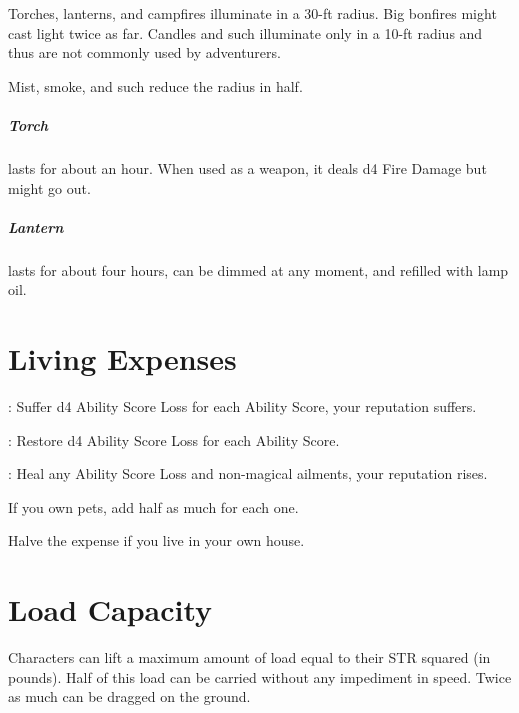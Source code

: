 \documentclass[itdr]{subfiles}
\begin{document}
Torches, lanterns, and campfires illuminate in a \mbox{30-ft} radius. Big bonfires might cast light twice as far. Candles and such illuminate only in a 10-ft radius and thus are not commonly used by adventurers.

Mist, smoke, and such reduce the radius in half.

\subparagraph{Torch} lasts for about an hour. When used as a weapon, it deals d4 Fire Damage but might go out.

\subparagraph{Lantern} lasts for about four hours, can be dimmed at any moment, and refilled with lamp oil.

\vfill
\break

\section{Living Expenses}

:
Suffer d4 Ability Score Loss for each Ability Score, your reputation suffers.

:
Restore d4 Ability Score Loss for each Ability Score.

:
Heal any Ability Score Loss and non-magical ailments, your reputation rises.

If you own pets, add half as much for each one.

Halve the expense if you live in your own house.

\vfill

\section{Load Capacity}

Characters can lift a maximum amount of load equal to their STR squared (in pounds). Half of this load can be carried without any impediment in speed. Twice as much can be dragged on the ground.
\end{document}
